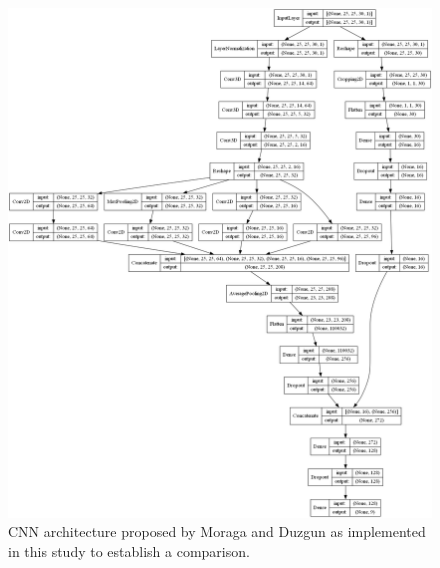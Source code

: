\begin{figure}[ht]
    \centering
    \includegraphics[width=\linewidth]{figs/vineyard_classification/networks/jigsaw_hsi_25x24_0.png}
	\caption{CNN architecture proposed by Moraga and Duzgun \cite{moraga_jigsawhsi_2022} as implemented in this study to establish a comparison. }
	\label{fig:jigsaw_cnn}
\end{figure}

